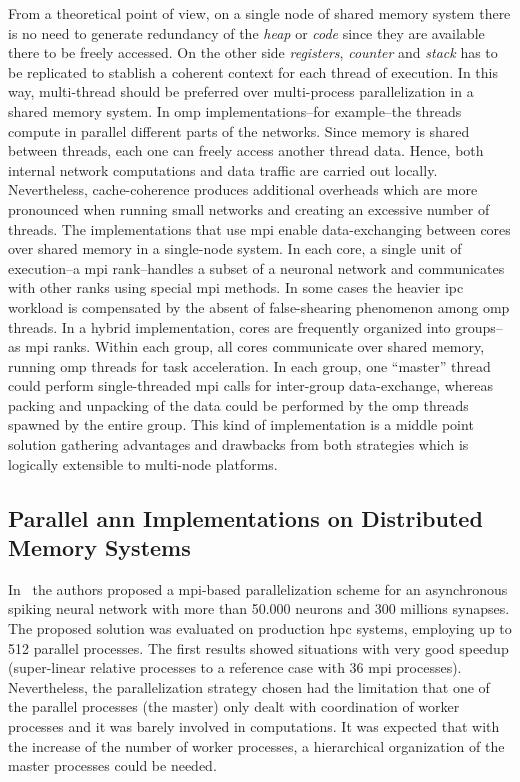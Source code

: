 \documentclass[10pt,journal,compsoc]{IEEEtran}
\begin{document}
From a theoretical point of view, on a single node of shared memory system there is no need to generate redundancy of the \emph{heap} or \emph{code} since they are available there to be freely accessed. On the other side \emph{registers}, \emph{counter} and \emph{stack} has to be replicated to stablish a coherent context for each thread of execution. In this way, multi-thread should be preferred over multi-process parallelization in a shared memory system. In \gls{omp} implementations--for example--the threads compute in parallel different parts of the networks. Since memory is shared between threads, each one can freely access another thread data. Hence, both internal network computations and data traffic are carried out locally. Nevertheless, cache-coherence produces additional overheads which are more pronounced when running small networks and creating an excessive number of threads. The implementations that use \gls{mpi} enable data-exchanging between cores over shared memory in a single-node system. In each core, a single unit of execution--a \gls{mpi} rank--handles a subset of a neuronal network and communicates with other ranks using special \gls{mpi} methods. In some cases the heavier \gls{ipc} workload is compensated by the absent of false-shearing phenomenon among \gls{omp} threads. In a hybrid implementation, cores are frequently organized into groups--as \gls{mpi} ranks. Within each group, all cores communicate over shared memory, running \gls{omp} threads for task acceleration. In each group, one “master” thread could perform single-threaded \gls{mpi} calls for inter-group data-exchange, whereas packing and unpacking of the data could be performed by the \gls{omp} threads spawned by the entire group. This kind of implementation is a middle point solution gathering advantages and drawbacks from both strategies which is logically extensible to multi-node platforms.












\subsection{Parallel \gls{ann} Implementations on Distributed Memory Systems}

In~\cite{6821186} the authors proposed a \gls{mpi}-based parallelization scheme for an asynchronous spiking neural network with more than 50.000 neurons and 300 millions synapses. The proposed solution was evaluated on production \gls{hpc} systems, employing up to 512 parallel processes. The first results showed situations with very good speedup (super-linear relative processes to a reference case with 36 \gls{mpi} processes). Nevertheless, the parallelization strategy chosen had the limitation that one of the parallel processes (the master) only dealt with coordination of worker processes and it was barely involved in computations. It was expected that with the increase of the number of worker processes, a hierarchical organization of the master processes could be needed.
\end{document}
